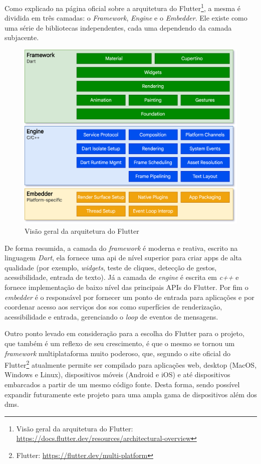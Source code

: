 Como explicado na página oficial sobre a arquitetura do Flutter\footnote{\label{flutter_arch}Visão geral da arquitetura do Flutter: \url{https://docs.flutter.dev/resources/architectural-overview}}, a mesma é dividida em três camadas: o \textit{Framework}, \textit{Engine} e o \textit{Embedder}. Ele existe como uma série de bibliotecas independentes, cada uma dependendo da camada subjacente. 

\begin{figure}[H]
\centering
  \includegraphics[width=\columnwidth]{images/flutter-archdiagram.png}
  \caption{Visão geral da arquitetura do Flutter}
  \label{fig:flutter-archdiagram}
\end{figure}

De forma resumida, a camada do \textit{framework} é moderna e reativa, escrito na linguagem \textit{Dart}, ela fornece uma \ac{api} de nível superior para criar \acp{app} de alta qualidade (por exemplo, \textit{widgets}, teste de cliques, detecção de gestos, acessibilidade, entrada de texto). Já a camada de \textit{engine} é escrita em \textit{c++} e fornece implementação de baixo nível das principais APIs do Flutter. Por fim o \textit{embedder} é o responsável por fornecer um ponto de entrada para aplicações e por coordenar acesso aos serviços dos \acp{so} como superfícies de renderização, acessibilidade e entrada, gerenciando o \textit{loop} de eventos de mensagens.

Outro ponto levado em consideração para a escolha do Flutter para o projeto, que também é um reflexo de seu crescimento, é que o mesmo se tornou um \textit{framework} multiplataforma muito poderoso, que, segundo o site oficial do Flutter\footnote{Flutter: \url{https://flutter.dev/multi-platform}} atualmente permite ser compilado para aplicações web, desktop (MacOS, Windows e Linux), dispositivos móveis (Android e iOS) e até dispositivos embarcados a partir de um mesmo código fonte. Desta forma, sendo possível expandir futuramente este projeto para uma ampla gama de dispositivos além dos \acp{dm}.

